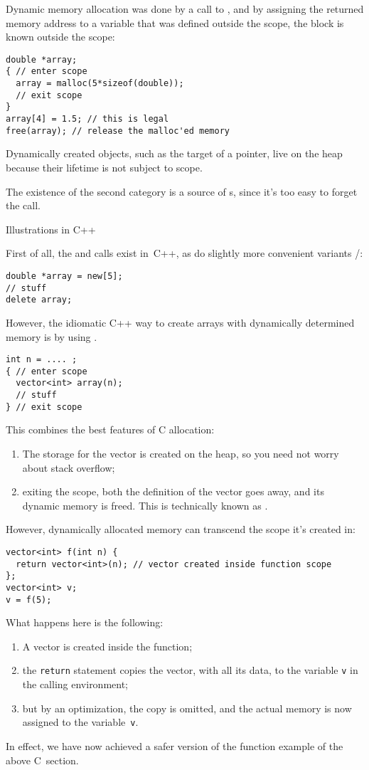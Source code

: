 Dynamic memory allocation was done by a call to ,
and by assigning the returned memory address to a variable
that was defined outside the scope, the block is known outside the scope:
\begin{lstlisting}
double *array;
{ // enter scope
  array = malloc(5*sizeof(double));
  // exit scope
}
array[4] = 1.5; // this is legal
free(array); // release the malloc'ed memory
\end{lstlisting}
Dynamically created objects, such as the target of a pointer,
live on the heap because their lifetime is not subject to scope.

The existence of the second category is a source of
s, since it's too easy to forget the  call.

 {Illustrations in C++}

First of all, the  and  calls exist in~C++,
as do slightly more convenient variants /:
\begin{lstlisting}
double *array = new[5];
// stuff
delete array;
\end{lstlisting}

However, the idiomatic C++ way to create arrays with dynamically determined memory
is by using .
\begin{lstlisting}
int n = .... ;
{ // enter scope
  vector<int> array(n);
  // stuff
} // exit scope
\end{lstlisting}
This combines the best features of C allocation:
\begin{enumerate}
\item The storage for the vector is created on the heap,
  so you need not worry about stack overflow;
\item exiting the scope, both the definition of the vector goes away,
  and its dynamic memory is freed.
  This is technically known as .
\end{enumerate}

However, dynamically allocated memory can transcend the scope
it's created in:
\begin{lstlisting}
vector<int> f(int n) {
  return vector<int>(n); // vector created inside function scope
};
vector<int> v;
v = f(5);
\end{lstlisting}
What happens here is the following:
\begin{enumerate}
\item A vector is created inside the function;
\item the \lstinline{return} statement copies the vector,
  with all its data, to the variable \lstinline{v}
  in the calling environment;
\item but by an optimization, the copy is omitted, and the actual
  memory is now assigned to the variable~\lstinline{v}.
\end{enumerate}
In effect, we have now achieved a safer version of the function example
of the above C~section.

